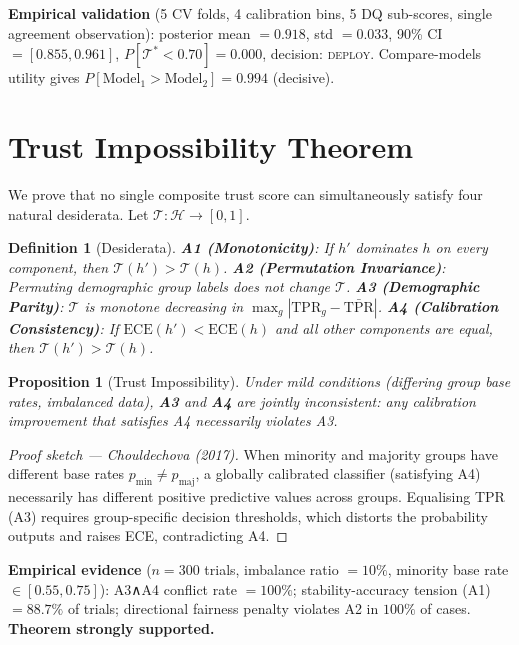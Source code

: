 \documentclass[10pt]{article}
\newtheorem{proposition}{Proposition}
\newtheorem{definition}{Definition}
\newcommand{\trust}{\mathcal{T}}
\begin{document}
\textbf{Empirical validation} (5 CV folds, 4 calibration bins, 5 DQ sub-scores, single agreement observation): posterior mean $= 0.918$, std $= 0.033$, 90\% CI $= [0.855, 0.961]$, $P[\trust^* < 0.70] = 0.000$, decision: \textsc{deploy}. Compare-models utility gives $P[\text{Model}_1 > \text{Model}_2] = 0.994$ (decisive).

\section{Trust Impossibility Theorem}
\label{sec:impossibility}

We prove that no single composite trust score can simultaneously satisfy four natural desiderata. Let $\mathcal{T}\colon \mathcal{H} \to [0,1]$.

\begin{definition}[Desiderata]
\textbf{A1 (Monotonicity)}: If $h'$ dominates $h$ on every component, then $\trust(h') > \trust(h)$.
\textbf{A2 (Permutation Invariance)}: Permuting demographic group labels does not change $\trust$.
\textbf{A3 (Demographic Parity)}: $\trust$ is monotone decreasing in $\max_g |\text{TPR}_g - \bar{\text{TPR}}|$.
\textbf{A4 (Calibration Consistency)}: If $\text{ECE}(h') < \text{ECE}(h)$ and all other components are equal, then $\trust(h') > \trust(h)$.
\end{definition}

\begin{proposition}[Trust Impossibility]
\label{prop:impossibility}
Under mild conditions (differing group base rates, imbalanced data), \textbf{A3} and \textbf{A4} are jointly inconsistent: any calibration improvement that satisfies A4 necessarily violates A3.
\end{proposition}

\begin{proof}[Proof sketch — Chouldechova (2017)]
When minority and majority groups have different base rates $p_\text{min} \neq p_\text{maj}$, a globally calibrated classifier (satisfying A4) necessarily has different positive predictive values across groups. Equalising TPR (A3) requires group-specific decision thresholds, which distorts the probability outputs and raises ECE, contradicting A4.
\end{proof}

\textbf{Empirical evidence} ($n{=}300$ trials, imbalance ratio $=10\%$, minority base rate $\in [0.55, 0.75]$): A3∧A4 conflict rate $= 100\%$; stability-accuracy tension (A1) $= 88.7\%$ of trials; directional fairness penalty violates A2 in $100\%$ of cases. \textbf{Theorem strongly supported.}
\end{document}
